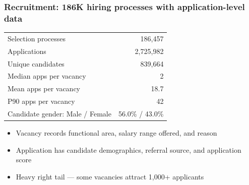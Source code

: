 \documentclass[aspectratio=169, 11pt]{beamer}
\begin{document}
\begin{frame}
\frametitle{Recruitment: 186K hiring processes with application-level data}

\begin{center}
\small
\begin{tabular}{@{}lr@{}}
\toprule
Selection processes & 186,457 \\
Applications & 2,725,982 \\
Unique candidates & 839,664 \\
\midrule
Median apps per vacancy & 2 \\
Mean apps per vacancy & 18.7 \\
P90 apps per vacancy & 42 \\
\midrule
Candidate gender: Male / Female & 56.0\% / 43.0\% \\
\bottomrule
\end{tabular}
\end{center}

\vspace{0.3cm}
\begin{itemize}
    \item Vacancy records functional area, salary range offered, and reason %
    \medskip
    \item Application has candidate demographics, referral source, and application score
    \medskip
    \item Heavy right tail --- some vacancies attract 1,000+ applicants
\end{itemize}

\end{frame}

\end{document}
